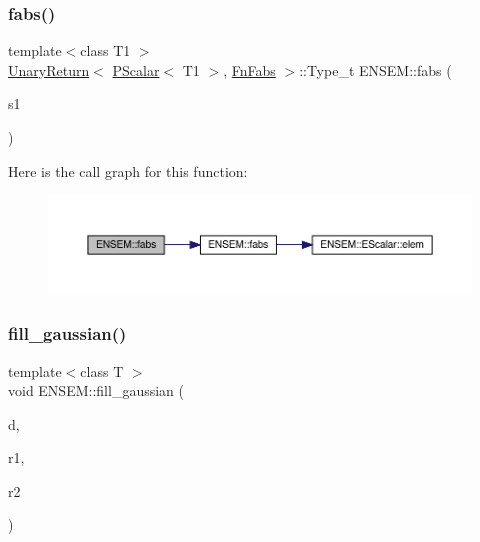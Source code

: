 \subsubsection{\texorpdfstring{fabs()}{fabs()}}
{\footnotesize\ttfamily template$<$class T1 $>$ \\
\mbox{\hyperlink{structENSEM_1_1UnaryReturn}{Unary\+Return}}$<$ \mbox{\hyperlink{classENSEM_1_1PScalar}{P\+Scalar}}$<$ T1 $>$, \mbox{\hyperlink{structENSEM_1_1FnFabs}{Fn\+Fabs}} $>$\+::Type\+\_\+t E\+N\+S\+E\+M\+::fabs (\begin{DoxyParamCaption}\item[{const \mbox{\hyperlink{classENSEM_1_1PScalar}{P\+Scalar}}$<$ T1 $>$ \&}]{s1 }\end{DoxyParamCaption})\hspace{0.3cm}{\ttfamily [inline]}}

Here is the call graph for this function\+:\nopagebreak
\begin{figure}[H]
\begin{center}
\leavevmode
\includegraphics[width=350pt]{db/dcc/group__primscalar_ga974d25e3b2bee6a839ad06b019932122_cgraph}
\end{center}
\end{figure}
\mbox{\label{group__primscalar_gaec5e0050ee9c339ede0d4b1a839cea7b}} 
\subsubsection{\texorpdfstring{fill\_gaussian()}{fill\_gaussian()}}
{\footnotesize\ttfamily template$<$class T $>$ \\
void E\+N\+S\+E\+M\+::fill\+\_\+gaussian (\begin{DoxyParamCaption}\item[{\mbox{\hyperlink{classENSEM_1_1PScalar}{P\+Scalar}}$<$ T $>$ \&}]{d,  }\item[{\mbox{\hyperlink{classENSEM_1_1PScalar}{P\+Scalar}}$<$ T $>$ \&}]{r1,  }\item[{\mbox{\hyperlink{classENSEM_1_1PScalar}{P\+Scalar}}$<$ T $>$ \&}]{r2 }\end{DoxyParamCaption})\hspace{0.3cm}{\ttfamily [inline]}}



